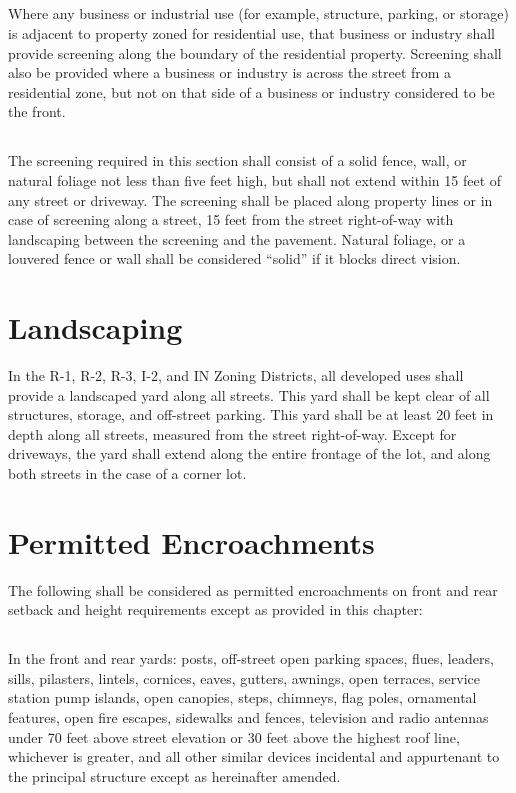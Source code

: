 \subsection{}
Where any business or industrial use (for example, structure, parking, or storage) is adjacent to property zoned for residential use, that business or industry shall provide screening along the boundary of the residential property. Screening shall also be provided where a business or industry is across the street from a residential zone, but not on that side of a business or industry considered to be the front.
\subsection{}
The screening required in this section shall consist of a solid fence, wall, or natural foliage not less than five feet high, but shall not extend within 15 feet of any street or driveway. The screening shall be placed along property lines or in case of screening along a street, 15 feet from the street right-of-way with landscaping between the screening and the pavement. Natural foliage, or a louvered fence or wall shall be considered “solid” if it blocks direct vision.

\section{Landscaping}
In the R-1, R-2, R-3, I-2, and IN Zoning Districts, all developed uses shall provide a landscaped yard along all streets.  This yard shall be kept clear of all structures, storage, and off-street parking.  This yard shall be at least 20 feet in depth along all streets, measured from the street right-of-way.  Except for driveways, the yard shall extend along the entire frontage of the lot, and along both streets in the case of a corner lot.

\section{Permitted Encroachments}
The following shall be considered as permitted encroachments on front and rear setback and height requirements except as provided in this chapter:
\subsection{}
In the front and rear yards:  posts, off-street open parking spaces, flues, leaders, sills, pilasters, lintels, cornices, eaves, gutters, awnings, open terraces, service station pump islands, open canopies, steps, chimneys, flag poles, ornamental features, open fire escapes, sidewalks and fences, television and radio antennas under 70 feet above street elevation or 30 feet above the highest roof line, whichever is greater, and all other similar devices incidental and appurtenant to the principal structure except as hereinafter amended.

